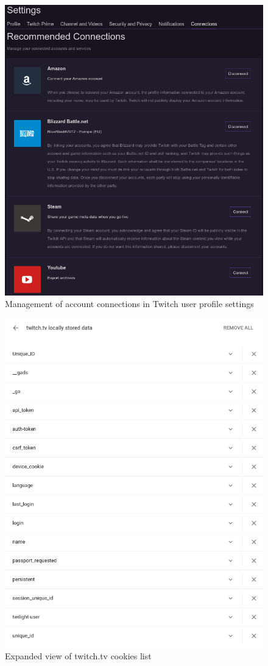 \begin{figure}[h!]
	\centering
	\includegraphics[height=0.9\linewidth]{sections/figures/recommended_connections}
	\caption{Management of account connections in Twitch user profile settings}
	\label{fig:recommended_connections}
\end{figure}

\begin{figure}[h]
	\centering
	\includegraphics[width=0.9\linewidth]{sections/figures/twitch_local_cookies_2}
	\caption{Expanded view of twitch.tv cookies list}
	\label{fig:twitch-local-cookies-2}
\end{figure}

